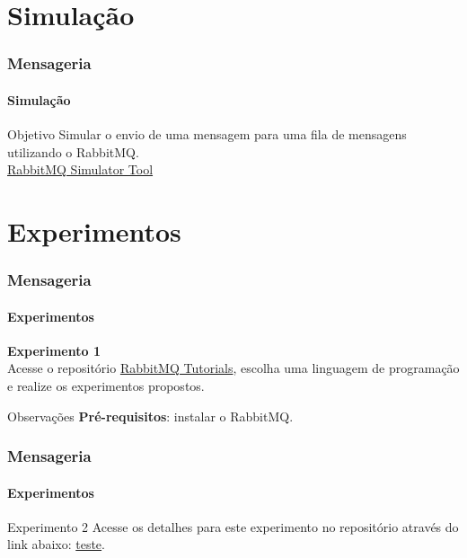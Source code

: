 \documentclass[
	9pt, %
	t, %
]{beamer}
\newcommand{\iconLink}[2]{\href{#1}{\faLink \hspace{0.2em} {#2}}}
\begin{document}

\section{Simulação}

\begin{frame}
	\frametitle{Mensageria}
	\framesubtitle{Simulação}
	\centering

	\begin{block}{Objetivo}
		Simular o envio de uma mensagem para uma fila de mensagens utilizando o RabbitMQ.
		\\ \bigskip
		\iconLink{https://tryrabbitmq.com/}{RabbitMQ Simulator Tool}
	\end{block}

\end{frame}

\section{Experimentos}

\begin{frame}
	\frametitle{Mensageria}
	\framesubtitle{Experimentos}

	{\Large \textbf{Experimento 1}} \\

	Acesse o repositório
	\href{https://github.com/rabbitmq/rabbitmq-tutorials?tab=readme-ov-file}{RabbitMQ
		Tutorials}, escolha uma linguagem de programação e realize os experimentos
	propostos.

	\begin{block}{Observações}
		\textbf{Pré-requisitos}: instalar o RabbitMQ.
	\end{block}

\end{frame}

\begin{frame}
	\frametitle{Mensageria}
	\framesubtitle{Experimentos}

	\begin{block}{Experimento 2}
		Acesse os detalhes para este experimento no repositório através do link abaixo:
		\iconLink{Typeset}{teste}.
	\end{block}

\end{frame}

\end{document}
